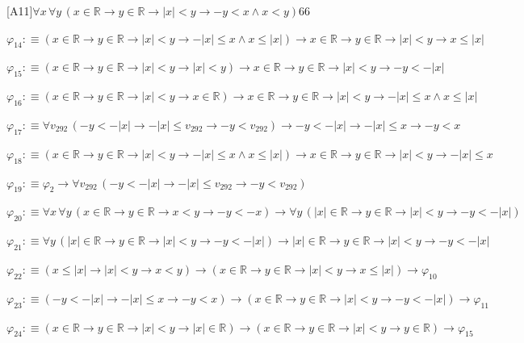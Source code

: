 \begin{fullproof}{[A11]}{$\forall x\,\forall y\,(x \in \mathbb{R} \to y \in \mathbb{R} \to \lvert x \rvert < y \to -y < x \land x < y)$}{66}
\begin{abbrevlist}
\item $\varphi_{14} :\equiv (x \in \mathbb{R} \to y \in \mathbb{R} \to \lvert x \rvert < y \to -\lvert x \rvert \leq x \land x \leq \lvert x \rvert) \to x \in \mathbb{R} \to y \in \mathbb{R} \to \lvert x \rvert < y \to x \leq \lvert x \rvert$
\item $\varphi_{15} :\equiv (x \in \mathbb{R} \to y \in \mathbb{R} \to \lvert x \rvert < y \to \lvert x \rvert < y) \to x \in \mathbb{R} \to y \in \mathbb{R} \to \lvert x \rvert < y \to -y < -\lvert x \rvert$
\item $\varphi_{16} :\equiv (x \in \mathbb{R} \to y \in \mathbb{R} \to \lvert x \rvert < y \to x \in \mathbb{R}) \to x \in \mathbb{R} \to y \in \mathbb{R} \to \lvert x \rvert < y \to -\lvert x \rvert \leq x \land x \leq \lvert x \rvert$
\item $\varphi_{17} :\equiv \forall v_{292}\,(-y < -\lvert x \rvert \to -\lvert x \rvert \leq v_{292} \to -y < v_{292}) \to -y < -\lvert x \rvert \to -\lvert x \rvert \leq x \to -y < x$
\item $\varphi_{18} :\equiv (x \in \mathbb{R} \to y \in \mathbb{R} \to \lvert x \rvert < y \to -\lvert x \rvert \leq x \land x \leq \lvert x \rvert) \to x \in \mathbb{R} \to y \in \mathbb{R} \to \lvert x \rvert < y \to -\lvert x \rvert \leq x$
\item $\varphi_{19} :\equiv \varphi_{2} \to \forall v_{292}\,(-y < -\lvert x \rvert \to -\lvert x \rvert \leq v_{292} \to -y < v_{292})$
\item $\varphi_{20} :\equiv \forall x\,\forall y\,(x \in \mathbb{R} \to y \in \mathbb{R} \to x < y \to -y < -x) \to \forall y\,(\lvert x \rvert \in \mathbb{R} \to y \in \mathbb{R} \to \lvert x \rvert < y \to -y < -\lvert x \rvert)$
\item $\varphi_{21} :\equiv \forall y\,(\lvert x \rvert \in \mathbb{R} \to y \in \mathbb{R} \to \lvert x \rvert < y \to -y < -\lvert x \rvert) \to \lvert x \rvert \in \mathbb{R} \to y \in \mathbb{R} \to \lvert x \rvert < y \to -y < -\lvert x \rvert$
\item $\varphi_{22} :\equiv (x \leq \lvert x \rvert \to \lvert x \rvert < y \to x < y) \to (x \in \mathbb{R} \to y \in \mathbb{R} \to \lvert x \rvert < y \to x \leq \lvert x \rvert) \to \varphi_{10}$
\item $\varphi_{23} :\equiv (-y < -\lvert x \rvert \to -\lvert x \rvert \leq x \to -y < x) \to (x \in \mathbb{R} \to y \in \mathbb{R} \to \lvert x \rvert < y \to -y < -\lvert x \rvert) \to \varphi_{11}$
\item $\varphi_{24} :\equiv (x \in \mathbb{R} \to y \in \mathbb{R} \to \lvert x \rvert < y \to \lvert x \rvert \in \mathbb{R}) \to (x \in \mathbb{R} \to y \in \mathbb{R} \to \lvert x \rvert < y \to y \in \mathbb{R}) \to \varphi_{15}$
\end{abbrevlist}
\end{fullproof}
